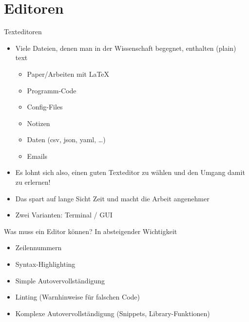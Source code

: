 \section{Editoren}




\begin{frame}{Texteditoren}
  \begin{itemize}
    \item Viele Dateien, denen man in der Wissenschaft begegnet, enthalten (plain) text
      \begin{itemize}
        \item Paper/Arbeiten mit \LaTeX
        \item Programm-Code
        \item Config-Files
        \item Notizen
        \item Daten (csv, json, yaml, …)
        \item Emails
      \end{itemize}
    \item Es lohnt sich also, einen guten Texteditor zu wählen und den Umgang damit zu erlernen!
    \item Das spart auf lange Sicht Zeit und macht die Arbeit angenehmer
    \item Zwei Varianten: Terminal / GUI
  \end{itemize}
\end{frame}

\begin{frame}{Was muss ein Editor können?}
  In absteigender Wichtigkeit

  \begin{itemize}
    \item Zeilennummern
    \item Syntax-Highlighting
    \item Simple Autovervollständigung
    \item Linting (Warnhinweise für falschen Code)
    \item Komplexe Autovervollständigung (Snippets, Library-Funktionen)
  \end{itemize}
\end{frame}

